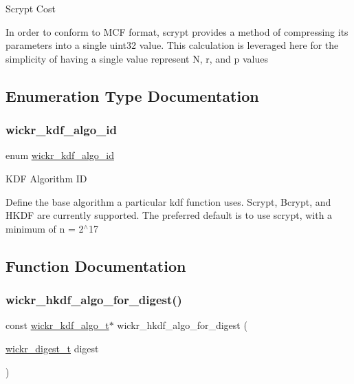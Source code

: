 Scrypt Cost

In order to conform to M\+CF format, scrypt provides a method of compressing its parameters into a single uint32 value. This calculation is leveraged here for the simplicity of having a single value represent N, r, and p values 

\subsection{Enumeration Type Documentation}
\mbox{\label{group__wickr__kdf_ga106149e3507106abb6b5be843a4e7c16}} 
\subsubsection{\texorpdfstring{wickr\+\_\+kdf\+\_\+algo\+\_\+id}{wickr\_kdf\_algo\_id}}
{\footnotesize\ttfamily enum \hyperlink{group__wickr__kdf_ga106149e3507106abb6b5be843a4e7c16}{wickr\+\_\+kdf\+\_\+algo\+\_\+id}}

K\+DF Algorithm ID

Define the base algorithm a particular kdf function uses. Scrypt, Bcrypt, and H\+K\+DF are currently supported. The preferred default is to use scrypt, with a minimum of n = 2$^\wedge$17 

\subsection{Function Documentation}
\mbox{\label{group__wickr__kdf_ga81c7a5adea69d04e019dd58080268a08}} 
\subsubsection{\texorpdfstring{wickr\+\_\+hkdf\+\_\+algo\+\_\+for\+\_\+digest()}{wickr\_hkdf\_algo\_for\_digest()}}
{\footnotesize\ttfamily const \hyperlink{structwickr__kdf__algo}{wickr\+\_\+kdf\+\_\+algo\+\_\+t}$\ast$ wickr\+\_\+hkdf\+\_\+algo\+\_\+for\+\_\+digest (\begin{DoxyParamCaption}\item[{\hyperlink{structwickr__digest}{wickr\+\_\+digest\+\_\+t}}]{digest }\end{DoxyParamCaption})}


